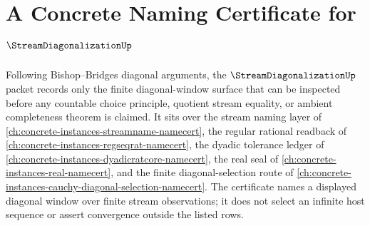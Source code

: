 \chapter{A Concrete Naming Certificate for $\StreamDiagonalizationUp$}
\label{ch:concrete-instances-stream-diagonalization-namecert}

Following Bishop--Bridges diagonal arguments, the $\StreamDiagonalizationUp$ packet records only the finite diagonal-window surface that can be inspected before any countable choice principle, quotient stream equality, or ambient completeness theorem is claimed. It sits over the stream naming layer of \autoref{ch:concrete-instances-streamname-namecert}, the regular rational readback of \autoref{ch:concrete-instances-regseqrat-namecert}, the dyadic tolerance ledger of \autoref{ch:concrete-instances-dyadicratcore-namecert}, the real seal of \autoref{ch:concrete-instances-real-namecert}, and the finite diagonal-selection route of \autoref{ch:concrete-instances-cauchy-diagonal-selection-namecert}. The certificate names a displayed diagonal window over finite stream observations; it does not select an infinite host sequence or assert convergence outside the listed rows.

